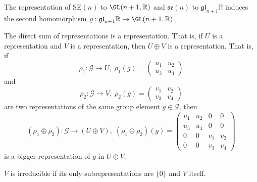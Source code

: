   \begin{example}
    \label{ex:matrix-representation-of-sen}
    The representation of SE$(n)$ to $\GL(n+1, \mathbb{R})$ and $\mathfrak{se}(n)$ to $\mathfrak{gl}_{n+1} \mathbb{R}$ induces the second homomorphism $\varrho: \mathfrak{gl}_{n+1} \mathbb{R} \rightarrow \GL(n+1, \mathbb{R})$. 
  \end{example}

  \begin{definition}
    \label{def:direct-sum-of-representations}
    The direct sum of representations is a representation. That is, if $U$ is a representation and $V$ is a representation, then $U \oplus V$ is a representation. That is, if 
    \begin{equation}
      \rho_1: \mathcal{G} \rightarrow U, \; \rho_1 (g) = \begin{pmatrix}
      u_1&u_2\\u_3&u_4
      \end{pmatrix}
    \end{equation}
    and
    \begin{equation}
      \rho_2: \mathcal{G} \rightarrow V, \; \rho_2 (g) = \begin{pmatrix}
      v_1 & v_2 \\ v_3 & v_4
      \end{pmatrix}
    \end{equation}
    are two representations of the same group element $g \in \mathcal{G}$, then 
    \begin{equation}
      (\rho_1 \oplus \rho_2): \mathcal{G} \rightarrow (U \oplus V), \;(\rho_1 \oplus \rho_2) (g) = \begin{pmatrix}
      u_1 & u_2 & 0 & 0 \\
      u_3 & u_4 & 0 & 0 \\
      0 & 0 & v_1 & v_2 \\
      0 & 0 & v_3 & v_4 
      \end{pmatrix}
    \end{equation}
    is a bigger representation of $g$ in $U \oplus V$. 
  \end{definition}

  \begin{definition}
    \label{def:irreducible-representation-2}
    $V$ is irreducible if its only subrepresentations are $\{0\}$ and $V$ itself. 
  \end{definition}


